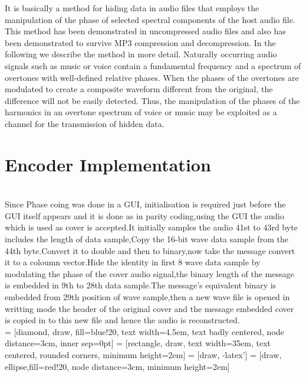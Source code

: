 \documentclass[a4paper, 12pt, notitlepage]{report}
\begin{document}
It is basically a method for hiding data in 
audio files that employs the manipulation of the phase of 
selected spectral components of the host audio file.  This 
method has been demonstrated in uncompressed audio 
files and also has been demonstrated to survive MP3 
compression and decompression. In the following we 
describe the method in more detail. 
Naturally occurring audio  signals such as music or 
voice contain a fundamental frequency and a spectrum of 
overtones with well-defined relative phases. When the 
phases of the overtones are modulated to create a 
composite waveform different from the original, the 
difference will not be easily detected. Thus, the 
manipulation of the phases of the harmonics in an 
overtone spectrum of voice or music may be exploited as 
a channel for the transmission of hidden data.

\section{Encoder Implementation}
\\
Since Phase coing was done in a GUI, initialisation is required just before the GUI itself appears and it is done as in parity coding,using the GUI the audio which is used as cover is accepted.It initially samples the audio 41st to 43rd byte includes the length of data sample,Copy the 16-bit wave data sample from the 44th byte.Convert it to double and then to binary,now take the message convert it to a coloumn vector.Hide the identity in first 8 wave data sample by modulating the phase of the cover audio signal,the binary length of the message is embedded in 9th to 28th data sample.The message's equivalent binary is embedded from 29th position of wave sample,then a new wave file is opened in writting mode the header of the original cover and the message embedded cover is copied in to this new file and hence the audio is reconstructed.\\

 = [diamond, draw, fill=blue!20, 
    text width=4.5em, text badly centered, node distance=3cm, inner sep=0pt]
 = [rectangle, draw,
    text width=35em, text centered, rounded corners, minimum height=2em]
 = [draw, -latex']
 = [draw, ellipse,fill=red!20, node distance=3cm,
    minimum height=2em]
\end{document}
